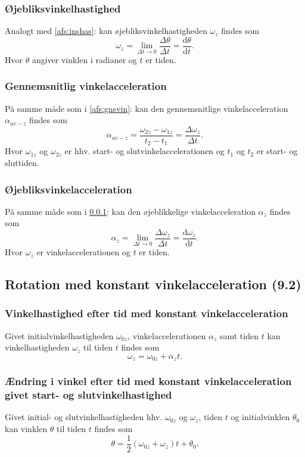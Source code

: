 \subsubsection{Øjebliksvinkelhastighed} \label{afs:insvin}
Analogt med \ref{afs:inshas}:  kan øjebliksvinkelhastigheden $\omega_z$ findes som
\[ 
\omega_z = \lim_{\Delta t \to 0} \frac{\Delta \theta}{\Delta t} = \frac{\mathrm{d}\theta}{\mathrm{d}t} 
.\]
Hvor $\theta$ angiver vinklen i radianer og $t$ er tiden.


\subsubsection{Gennemsnitlig vinkelacceleration} \label{afs:gnsvinacc}
På samme måde som i \ref{afs:gnsvin}:  kan den gennemsnitlige vinkelacceleration $\alpha_{av-z}$ findes som
\[ 
\alpha_{av-z} = \frac{\omega_{2z} - \omega_{1z}}{t_2 - t_1} = \frac{\Delta \omega_z}{\Delta t}
.\]
Hvor $\omega_{1z}$ og $\omega_{2z}$ er hhv. start- og slutvinkelaccelerationen og $t_1$ og $t_2$ er start- og sluttiden.


\subsubsection{Øjebliksvinkelacceleration} \label{afs:insvinacc}
På samme måde som i \ref{afs:insvin}:  kan den øjeblikkelige vinkelacceleration $\alpha_{z}$ findes som
\[ 
\alpha_z = \lim_{\Delta t \to 0} \frac{\Delta \omega_z}{\Delta t} = \frac{\mathrm{d}\omega_{z}}{\mathrm{d}t} 
.\]
Hvor $\omega_z$ er vinkelaccelerationen og $t$ er tiden.


\subsection{Rotation med konstant vinkelacceleration (9.2)}

\subsubsection{Vinkelhastighed efter tid med konstant vinkelacceleration} \label{afs:vinhaskonvinacc}
Givet initialvinkelhastigheden $\omega_{0z}$, vinkelaccelerationen $\alpha_z$ samt tiden $t$ kan vinkelhastigheden $\omega_z$ til tiden $t$ findes som
\[ 
\omega_z = \omega_{0z} + \alpha_z t
.\]


\subsubsection{Ændring i vinkel efter tid med konstant vinkelacceleration givet start- og slutvinkelhastighed} \label{afs:vinkonvin}
Givet initial- og slutvinkelhastigheden hhv. $\omega_{0z}$ og $\omega_z$, tiden $t$ og initialvinklen $\theta_0$ kan vinklen $\theta$ til tiden $t$ findes som
\[ 
\theta = \frac{1}{2}(\omega_{0z} + \omega_z)t + \theta_0
.\]

